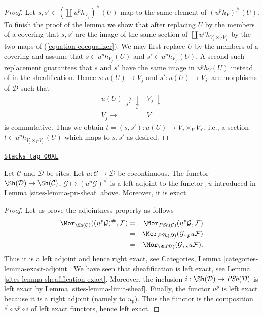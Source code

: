 \begin{proof}
\medskip\noindent
Let $s, s' \in (\coprod u^ph_{V_j})^\#(U)$ map to the same element
of $(u^ph_V)^\#(U)$. To finish the proof of the lemma we show that
after replacing $U$ by the members of a covering that $s, s'$ are
the image of the same section of $\coprod u^p h_{V_j \times_V V_{j'}}$
by the two maps of (\ref{equation-coequalizer}). We may first replace $U$
by the members of a covering and assume that $s \in u^ph_{V_j}(U)$
and $s' \in u^ph_{V_{j'}}(U)$. A second such replacement guarantees
that $s$ and $s'$ have the same image in $u^ph_V(U)$ instead of in
the sheafification. Hence $s : u(U) \to V_j$ and $s' : u(U) \to V_{j'}$
are morphisms of $\mathcal{D}$ such that
$$
\begin{array}{cc}u(U) \underset{s'}{\longrightarrow}\underset{s}{\downarrow} & V_{j'} \downarrow \\ V_j \longrightarrow & V\end{array}
$$
is commutative. Thus we obtain $t = (s, s') : u(U) \to V_j \times_V V_{j'}$,
i.e., a section $t \in u^ph_{V_j \times_V V_{j'}}(U)$
which maps to $s, s'$ as desired.
\end{proof}

\begin{lemma}
\label{sites-lemma-exact-cocontinuous}
\href{https://stacks.math.columbia.edu/tag/00XL}{\texttt{Stacks tag 00XL}}

Let $\mathcal{C}$ and $\mathcal{D}$ be sites.
Let $u : \mathcal{C} \to \mathcal{D}$ be cocontinuous.
The functor
$\Sh(\mathcal{D}) \to \Sh(\mathcal{C})$,
$\mathcal{G} \mapsto (u^p\mathcal{G})^\#$
is a left adjoint to the functor ${}_su$ introduced
in Lemma \ref{sites-lemma-pu-sheaf} above. Moreover, it
is exact.
\end{lemma}

\begin{proof}

Let us prove the adjointness property as follows
\begin{eqnarray*}
\Mor_{\Sh(\mathcal{C})}
((u^p\mathcal{G})^\#, \mathcal{F})
& = &
\Mor_{\textit{PSh}(\mathcal{C})}
(u^p\mathcal{G}, \mathcal{F}) \\
& = &
\Mor_{\textit{PSh}(\mathcal{D})}
(\mathcal{G}, {}_pu\mathcal{F}) \\
& = &
\Mor_{\Sh(\mathcal{D})}
(\mathcal{G}, {}_su\mathcal{F}).
\end{eqnarray*}
Thus it is a left adjoint and hence right exact,
see Categories, Lemma \ref{categories-lemma-exact-adjoint}.
We have seen that sheafification is left exact,
see Lemma \ref{sites-lemma-sheafification-exact}.
Moreover, the inclusion
$i : \Sh(\mathcal{D}) \to \textit{PSh}(\mathcal{D})$
is left exact by Lemma \ref{sites-lemma-limit-sheaf}. Finally, the functor
$u^p$ is left exact because it is a right adjoint
(namely to $u_p$). Thus the functor is the composition
${}^\# \circ u^p \circ i$ of left exact functors,
hence left exact.
\end{proof}

